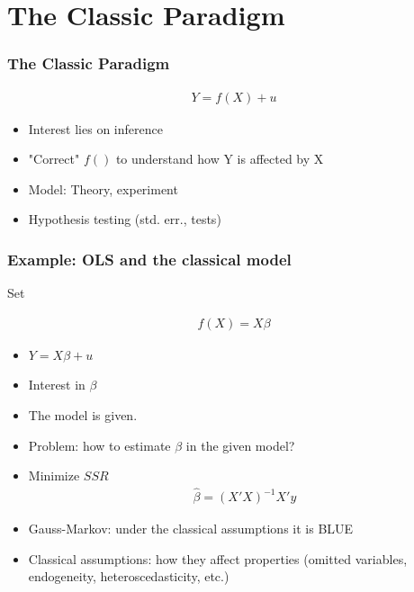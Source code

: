 \documentclass[
  shownotes,
  xcolor={svgnames},
  hyperref={colorlinks,citecolor=DarkBlue,linkcolor=DarkRed,urlcolor=DarkBlue}
  ]{beamer}
\begin{document}
\section{The Classic Paradigm}
\begin{frame}
\frametitle{The Classic Paradigm}


\begin{align}
Y=f(X)+u
\end{align}
\medskip
\begin{itemize}
  \item Interest lies on inference
  \medskip
  \item "Correct" $f()$ to understand how Y is affected by X
  \medskip
  \item Model: Theory, experiment
  \medskip
  \item Hypothesis testing (std. err., tests)
\end{itemize}

\end{frame}

\begin{frame}
\frametitle{Example: OLS and the classical model}

Set

\begin{align}
f(X)=X\beta
\end{align}

\begin{itemize}
    \item $Y=X\beta+u$
    \item Interest in $\beta$

    \item The model is given.
    \item Problem: how to estimate $\beta$ in the given model?
    \item Minimize $SSR$
      \begin{align}
          \hat \beta= (X'X)^{-1} X'y
      \end{align}


    \item Gauss-Markov: under the classical assumptions it is BLUE

    \item Classical assumptions: how they affect properties (omitted variables, endogeneity, heteroscedasticity, etc.)
\end{itemize}

\end{frame}
\end{document}
